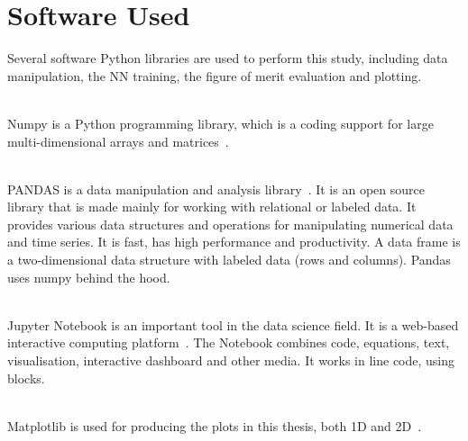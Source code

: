 \section{Software Used}

Several software Python libraries are used to perform this study, including data manipulation, the NN training, the figure of merit evaluation and plotting.

\ \\Numpy is a Python programming library, which is a coding support for large multi-dimensional arrays and matrices~\cite{Numpy}. 

\ \\PANDAS is a data manipulation and analysis library~\cite{PANDAS}. It is an open source library that is made mainly for working with relational or labeled data. It provides various data structures and operations for manipulating numerical data and time series. It is fast, has high performance and productivity. A data frame is a two-dimensional data structure with labeled data (rows and columns). Pandas uses numpy behind the hood. 

\ \\Jupyter Notebook is an important tool in the data science field. It is a web-based interactive computing platform~\cite{JupyterNotebook}. The Notebook combines code, equations, text, visualisation, interactive dashboard and other media. It works in line code, using blocks. 

\ \\Matplotlib is used for producing the plots in this thesis, both 1D and 2D~\cite{Matplotlib}.


